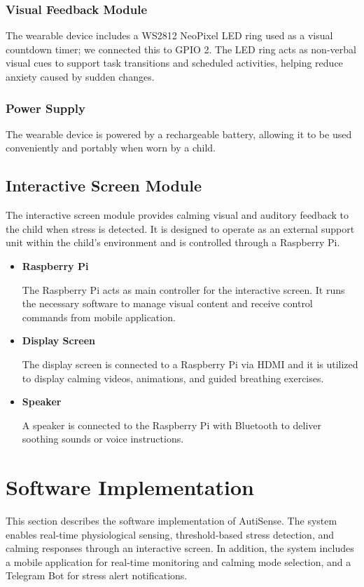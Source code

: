 \documentclass[a4paper,12pt]{report}
\begin{document}
\subsubsection{Visual Feedback Module}
The wearable device includes a WS2812 NeoPixel LED ring used as a visual countdown timer; we connected this to GPIO 2. The LED ring acts as non-verbal visual cues to support task transitions and scheduled activities, helping reduce anxiety caused by sudden changes.

\subsubsection{Power Supply}
The wearable device is powered by a rechargeable battery, allowing it to be used conveniently and portably when worn by a child.

\subsection{Interactive Screen Module}
The interactive screen module provides calming visual and auditory feedback to the child when stress is detected. It is designed to operate as an external support unit within the child’s environment and is controlled through a Raspberry Pi.

\begin{itemize}
    \item \textbf{Raspberry Pi}

    The Raspberry Pi acts as main controller for the interactive screen. It runs the necessary software to manage visual content and receive control commands from mobile application.

    \item \textbf{Display Screen}

    The display screen is connected to a Raspberry Pi via HDMI and it is utilized to display calming videos, animations, and guided breathing exercises.

    \item \textbf{Speaker}

    A speaker is connected to the Raspberry Pi with Bluetooth to deliver soothing sounds or voice instructions.
\end{itemize}

\section{Software Implementation}
This section describes the software implementation of AutiSense. The system enables real-time physiological sensing, threshold-based stress detection, and calming responses through an interactive screen. In addition, the system includes a mobile application for real-time monitoring and calming mode selection, and a Telegram Bot for stress alert notifications.
\end{document}
